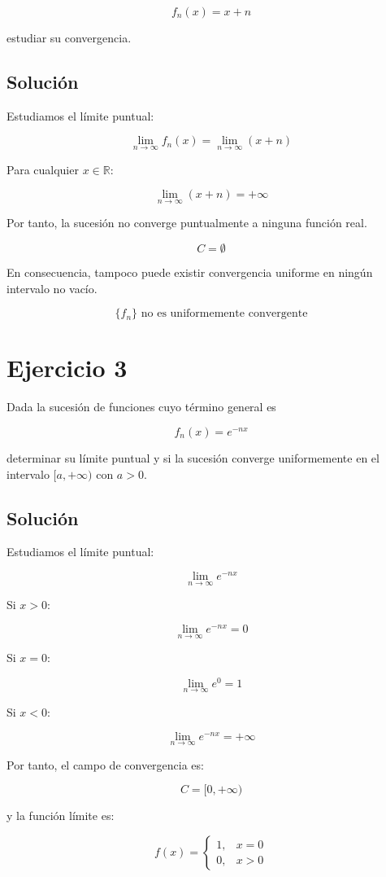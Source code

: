 \documentclass[fleqn]{article}
\begin{document}
	\[
	f_n(x)=x+n
	\]

	estudiar su convergencia.

	\subsection{Solución}

	Estudiamos el límite puntual:

	\[
	\lim_{n\to\infty}f_n(x)
	=
	\lim_{n\to\infty}(x+n)
	\]

	Para cualquier $x\in\mathbb{R}$:

	\[
	\lim_{n\to\infty}(x+n)=+\infty
	\]

	Por tanto, la sucesión no converge puntualmente a ninguna función real.

	\[
	\boxed{
	C=\emptyset
	}
	\]

	En consecuencia, tampoco puede existir convergencia uniforme en ningún intervalo no vacío.

	\[
	\boxed{
	\{f_n\}\text{ no es uniformemente convergente}
	}
	\]

\section{Ejercicio 3}
	Dada la sucesión de funciones cuyo término general es

	\[
	f_n(x)=e^{-nx}
	\]

	determinar su límite puntual y si la sucesión converge uniformemente en el intervalo
	$[a,+\infty)$ con $a>0$.

	\subsection{Solución}

	Estudiamos el límite puntual:

	\[
	\lim_{n\to\infty}e^{-nx}
	\]

	Si $x>0$:

	\[
	\lim_{n\to\infty}e^{-nx}=0
	\]

	Si $x=0$:

	\[
	\lim_{n\to\infty}e^0=1
	\]

	Si $x<0$:

	\[
	\lim_{n\to\infty}e^{-nx}=+\infty
	\]

	Por tanto, el campo de convergencia es:

	\[
	\boxed{
	C=[0,+\infty)
	}
	\]

	y la función límite es:

	\[
	f(x)=
	\begin{cases}
	1, & x=0 \\[1mm]
	0, & x>0
	\end{cases}
	\]
\end{document}
